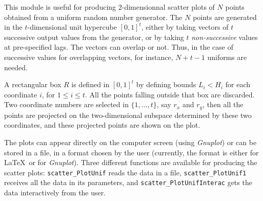 

This module is useful for producing 2-dimensionnal scatter
plots of $N$ points obtained from a uniform random number generator.
The $N$ points are generated in the $t$-dimensional unit hypercube $[0,1]^t$,
either by taking vectors of $t$ successive output values from the generator,
or by taking $t$ {\em non-successive\/} values at pre-specified lags.
The vectors can overlap or not.
Thus, in the case of successive values for overlapping vectors,
for instance, $N+t-1$ uniforms are needed.

A rectangular box $R$ is defined in $[0,1]^t$ by defining bounds $L_i < H_i$
for each coordinate $i$, for $1\le i\le t$.
All the points falling outside that box are discarded.
Two coordinate numbers are selected in $\{1,\dots,t\}$, say
$r_x$ and $r_y$, then all the points are projected on the two-dimensional
subspace determined by these two coordinates,
and these projected points are shown on the plot.

The plots can appear directly on the computer screen (using {\it Gnuplot})
or can be stored in a file, in a format chosen by the user
(currently, the format is either for \LaTeX\ or for  {\it Gnuplot}).
Three different functions are available for producing the scatter plots:
{\tt scatter\_PlotUnif} reads the data in a file,
{\tt scatter\_PlotUnif1} receives all the data in its parameters, and
{\tt scatter\_PlotUnifInterac} gets the data interactively from the user.


